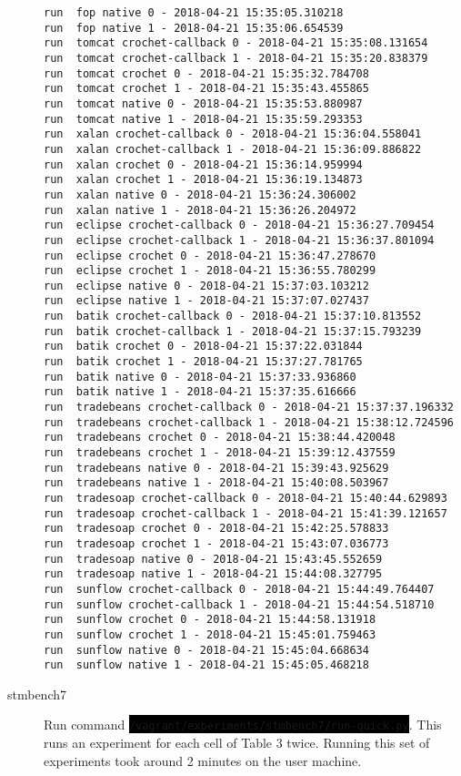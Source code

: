 \documentclass[12pt]{article}
\newcommand{\command}[1]{\colorbox{black}{\texttt{\color{white}#1}}}
\begin{document}
\begin{description}
\begin{verbatim}
run  fop native 0 - 2018-04-21 15:35:05.310218
run  fop native 1 - 2018-04-21 15:35:06.654539
run  tomcat crochet-callback 0 - 2018-04-21 15:35:08.131654
run  tomcat crochet-callback 1 - 2018-04-21 15:35:20.838379
run  tomcat crochet 0 - 2018-04-21 15:35:32.784708
run  tomcat crochet 1 - 2018-04-21 15:35:43.455865
run  tomcat native 0 - 2018-04-21 15:35:53.880987
run  tomcat native 1 - 2018-04-21 15:35:59.293353
run  xalan crochet-callback 0 - 2018-04-21 15:36:04.558041
run  xalan crochet-callback 1 - 2018-04-21 15:36:09.886822
run  xalan crochet 0 - 2018-04-21 15:36:14.959994
run  xalan crochet 1 - 2018-04-21 15:36:19.134873
run  xalan native 0 - 2018-04-21 15:36:24.306002
run  xalan native 1 - 2018-04-21 15:36:26.204972
run  eclipse crochet-callback 0 - 2018-04-21 15:36:27.709454
run  eclipse crochet-callback 1 - 2018-04-21 15:36:37.801094
run  eclipse crochet 0 - 2018-04-21 15:36:47.278670
run  eclipse crochet 1 - 2018-04-21 15:36:55.780299
run  eclipse native 0 - 2018-04-21 15:37:03.103212
run  eclipse native 1 - 2018-04-21 15:37:07.027437
run  batik crochet-callback 0 - 2018-04-21 15:37:10.813552
run  batik crochet-callback 1 - 2018-04-21 15:37:15.793239
run  batik crochet 0 - 2018-04-21 15:37:22.031844
run  batik crochet 1 - 2018-04-21 15:37:27.781765
run  batik native 0 - 2018-04-21 15:37:33.936860
run  batik native 1 - 2018-04-21 15:37:35.616666
run  tradebeans crochet-callback 0 - 2018-04-21 15:37:37.196332
run  tradebeans crochet-callback 1 - 2018-04-21 15:38:12.724596
run  tradebeans crochet 0 - 2018-04-21 15:38:44.420048
run  tradebeans crochet 1 - 2018-04-21 15:39:12.437559
run  tradebeans native 0 - 2018-04-21 15:39:43.925629
run  tradebeans native 1 - 2018-04-21 15:40:08.503967
run  tradesoap crochet-callback 0 - 2018-04-21 15:40:44.629893
run  tradesoap crochet-callback 1 - 2018-04-21 15:41:39.121657
run  tradesoap crochet 0 - 2018-04-21 15:42:25.578833
run  tradesoap crochet 1 - 2018-04-21 15:43:07.036773
run  tradesoap native 0 - 2018-04-21 15:43:45.552659
run  tradesoap native 1 - 2018-04-21 15:44:08.327795
run  sunflow crochet-callback 0 - 2018-04-21 15:44:49.764407
run  sunflow crochet-callback 1 - 2018-04-21 15:44:54.518710
run  sunflow crochet 0 - 2018-04-21 15:44:58.131918
run  sunflow crochet 1 - 2018-04-21 15:45:01.759463
run  sunflow native 0 - 2018-04-21 15:45:04.668634
run  sunflow native 1 - 2018-04-21 15:45:05.468218
\end{verbatim}

    \item[stmbench7] Run command
        \command{/vagrant/experiments/stmbench7/run-quick.py}.  This runs an
        experiment for each cell of Table 3 twice.  Running this set of
        experiments took around 2 minutes on the user machine.


\end{description}
\end{document}
